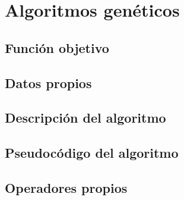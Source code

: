 \section{Algoritmos genéticos}
\subsection{Función objetivo}


\subsection{Datos propios}


\subsection{Descripción del algoritmo}

\subsection{Pseudocódigo del algoritmo}


\subsection{Operadores propios}
